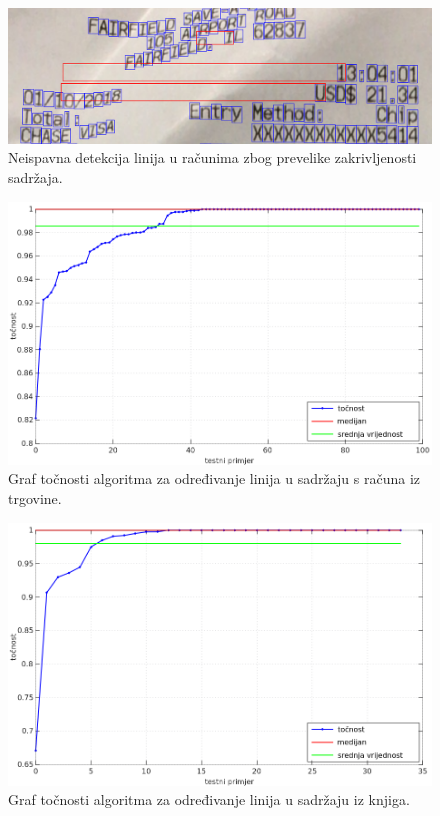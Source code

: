 \documentclass[times, utf8, zavrsni]{fer}
\begin{document}
\

\begin{figure}[!htb]
    \centering
    \captionsetup{justification=centering}
    \includegraphics[width=\textwidth]{images/error-01.png}
    \caption{
        Neispavna detekcija linija u računima zbog prevelike zakrivljenosti
        sadržaja.
    }
    \label{fig:error-01}
\end{figure}

\pagebreak

\begin{figure}[!htb]
    \centering
    \captionsetup{justification=centering}
    \includegraphics[width=\textwidth]{images/result-01.png}
    \caption{
        Graf točnosti algoritma za određivanje linija u sadržaju s računa iz trgovine.
    }
    \label{fig:result-01}
\end{figure}

\begin{figure}[!htb]
    \centering
    \captionsetup{justification=centering}
    \includegraphics[width=\textwidth]{images/result-02.png}
    \caption{
        Graf točnosti algoritma za određivanje linija u sadržaju iz knjiga.
    }
    \label{fig:result-02}
\end{figure}
\end{document}
